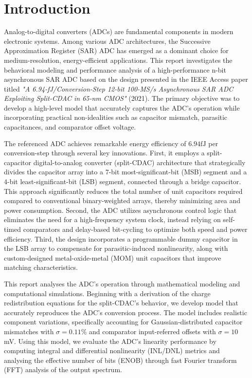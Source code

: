 \section{Introduction}

Analog-to-digital converters (ADCs) are fundamental components in modern electronic systems. Among various ADC architectures, the Successive Approximation Register (SAR) ADC has emerged as a dominant choice for medium-resolution, energy-efficient applications. This report investigates the behavioral modeling and performance analysis of a high-performance n-bit asynchronous SAR ADC based on the design presented in the IEEE Access paper titled \textit{"A 6.94-fJ/Conversion-Step 12-bit 100-MS/s Asynchronous SAR ADC Exploiting Split-CDAC in 65-nm CMOS"} (2021)\textsuperscript{\cite{paper}}. The primary objective was to develop a high-level model that accurately captures the ADC's operation while incorporating practical non-idealities such as capacitor mismatch, parasitic capacitances, and comparator offset voltage.

The referenced ADC achieves remarkable energy efficiency of $6.94 \si{\femto \joule}$ per conversion-step through several key innovations. First, it employs a split-capacitor digital-to-analog converter (split-CDAC) architecture that strategically divides the capacitor array into a 7-bit most-significant-bit (MSB) segment and a 4-bit least-significant-bit (LSB) segment, connected through a bridge capacitor. This approach significantly reduces the total number of unit capacitors required compared to conventional binary-weighted arrays, thereby minimizing area and power consumption. Second, the ADC utilizes asynchronous control logic that eliminates the need for a high-frequency system clock, instead relying on self-timed comparators and delay-based bit-cycling to optimize both speed and power efficiency. Third, the design incorporates a programmable dummy capacitor in the LSB array to compensate for parasitic-induced nonlinearity, along with custom-designed metal-oxide-metal (MOM) unit capacitors that improve matching characteristics.

This report analyses the ADC's operation through mathematical modeling and computational simulations. Beginning with a derivation of the charge redistribution equations for the split-CDAC's behavior, we develop model that accurately reproduces the ADC's conversion process. The model includes realistic component variations, specifically accounting for Gaussian-distributed capacitor mismatches with $\sigma = 0.11\%$ and comparator input-referred offsets with $\sigma = 10$ mV. Using this model, we evaluate the ADC's linearity performance by computing integral and differential nonlinearity (INL/DNL) metrics and analysing the effective number of bits (ENOB) through fast Fourier transform (FFT) analysis of the output spectrum.

